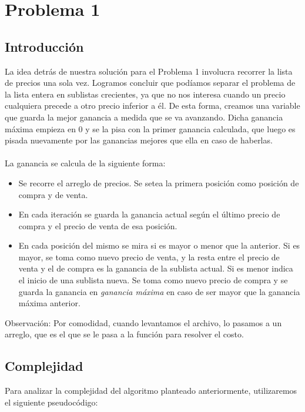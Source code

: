 \section{Problema 1}

\subsection{Introducción}

La idea detrás de nuestra solución para el Problema 1 involucra recorrer la lista de precios una sola vez. Logramos concluir que podíamos separar el problema de la lista entera en sublistas crecientes, ya que no nos interesa cuando un precio cualquiera precede a otro precio inferior a él. De esta forma, creamos una variable que guarda la mejor ganancia a medida que se va avanzando. Dicha ganancia máxima empieza en 0 y se la pisa con la primer ganancia calculada, que luego es pisada nuevamente por las ganancias mejores que ella en caso de haberlas.\\
\\
\indent La ganancia se calcula de la siguiente forma:
\begin{itemize}
	\item Se recorre el arreglo de precios. Se setea la primera posición como posición de compra y de venta.
	\item En cada iteración se guarda la ganancia actual según el último precio de compra y el precio de venta de esa posición.
	\item En cada posición del mismo se mira si es mayor o menor que la anterior. Si es mayor, se toma como nuevo precio de venta, y la resta entre el precio de venta y el de compra es la ganancia de la sublista actual. Si es menor indica el inicio de una sublista nueva. Se toma como nuevo precio de compra y se guarda la ganancia en \textit{ganancia máxima} en caso de ser mayor que la ganancia máxima anterior.
\end{itemize}

\indent Observación: Por comodidad, cuando levantamos el archivo, lo pasamos a un arreglo, que es el que se le pasa a la función para resolver el costo.\\

\subsection{Complejidad}
\indent Para analizar la complejidad del algoritmo planteado anteriormente, utilizaremos el siguiente pseudocódigo:

